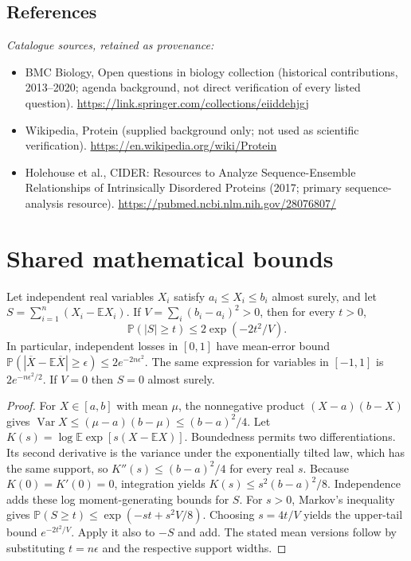\documentclass[11pt]{article}
\begin{document}
\subsection{References}
\noindent\emph{Catalogue sources, retained as provenance:}
\begin{itemize}
\item BMC Biology, Open questions in biology collection (historical contributions, 2013--2020; agenda background, not direct verification of every listed question). \url{https://link.springer.com/collections/eiiddehjgj}
\item Wikipedia, Protein (supplied background only; not used as scientific verification). \url{https://en.wikipedia.org/wiki/Protein}
\item Holehouse et al., CIDER: Resources to Analyze Sequence-Ensemble Relationships of Intrinsically Disordered Proteins (2017; primary sequence-analysis resource). \url{https://pubmed.ncbi.nlm.nih.gov/28076807/}
\end{itemize}




\section{Shared mathematical bounds}\label{app:bounds}
\begin{lemma}\label{lem:bounded}
Let independent real variables $X_i$ satisfy $a_i\leq X_i\leq b_i$ almost surely,
and let $S=\sum_{i=1}^n(X_i-\mathbb{E} X_i)$. If
$V=\sum_i(b_i-a_i)^2>0$, then for every $t>0$,
\[
 \mathbb{P}(|S|\geq t)\leq 2\exp(-2t^2/V).
\]
In particular, independent losses in $[0,1]$ have mean-error bound
$\mathbb{P}(|\overline X-\mathbb{E}\overline X|\geq\epsilon)
\leq2e^{-2n\epsilon^2}$. The same expression for variables in $[-1,1]$
is $2e^{-n\epsilon^2/2}$. If $V=0$ then $S=0$ almost surely.
\end{lemma}
\begin{proof}
For $X\in[a,b]$ with mean $\mu$, the nonnegative product
$(X-a)(b-X)$ gives
$\operatorname{Var} X\leq(\mu-a)(b-\mu)\leq(b-a)^2/4$.
Let $K(s)=\log\mathbb{E}\exp[s(X-\mathbb{E} X)]$.
Boundedness permits two differentiations. Its second derivative is the variance
under the exponentially tilted law, which has the same support, so
$K''(s)\leq(b-a)^2/4$ for every real $s$.
Because $K(0)=K'(0)=0$, integration yields
$K(s)\leq s^2(b-a)^2/8$.
Independence adds these log moment-generating bounds for $S$.
For $s>0$, Markov's inequality gives
$\mathbb{P}(S\geq t)\leq\exp(-st+s^2V/8)$.
Choosing $s=4t/V$ yields the upper-tail bound $e^{-2t^2/V}$.
Apply it also to $-S$ and add. The stated mean versions follow by substituting
$t=n\epsilon$ and the respective support widths.
\end{proof}
\end{document}
